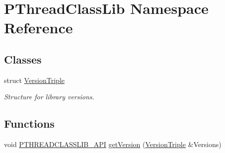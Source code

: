 \hypertarget{namespacePThreadClassLib}{}\section{P\+Thread\+Class\+Lib Namespace Reference}
\label{namespacePThreadClassLib}
\subsection*{Classes}
\begin{DoxyCompactItemize}
\item 
struct \hyperlink{structPThreadClassLib_1_1VersionTriple}{Version\+Triple}
\begin{DoxyCompactList}\small\item\em Structure for library versions. \end{DoxyCompactList}\end{DoxyCompactItemize}
\subsection*{Functions}
\begin{DoxyCompactItemize}
\item 
void \hyperlink{PThreadClassLib_8h_a7a7c16bf26ea875bcbc5bd1535989b45}{P\+T\+H\+R\+E\+A\+D\+C\+L\+A\+S\+S\+L\+I\+B\+\_\+\+A\+PI} \hyperlink{group__LIB__GROUP_ga6f7b61fdb8dcf8b5602c655ac81daef8}{get\+Version} (\hyperlink{structPThreadClassLib_1_1VersionTriple}{Version\+Triple} \&Versions)
\end{DoxyCompactItemize}
